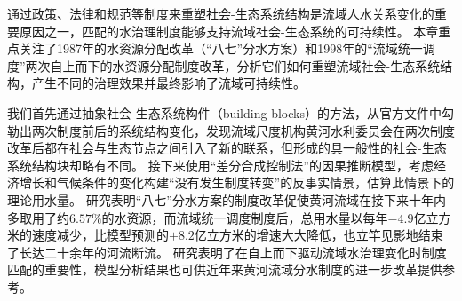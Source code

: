 通过政策、法律和规范等制度来重塑社会-生态系统结构是流域人水关系变化的重要原因之一，匹配的水治理制度能够支持流域社会-生态系统的可持续性。
本章重点关注了1987年的水资源分配改革（“八七”分水方案）和1998年的“流域统一调度”两次自上而下的水资源分配制度改革，分析它们如何重塑流域社会-生态系统结构，产生不同的治理效果并最终影响了流域可持续性。

我们首先通过抽象社会-生态系统构件（building blocks）的方法，从官方文件中勾勒出两次制度前后的系统结构变化，发现流域尺度机构黄河水利委员会在两次制度改革后都在社会与生态节点之间引入了新的联系，但形成的具一般性的社会-生态系统结构块却略有不同。
接下来使用“差分合成控制法”的因果推断模型，考虑经济增长和气候条件的变化构建“没有发生制度转变”的反事实情景，估算此情景下的理论用水量。
研究表明“八七”分水方案的制度改革促使黄河流域在接下来十年内多取用了约$6.57\%$的水资源，而流域统一调度制度后，总用水量以每年$-4.9$亿立方米的速度减少，比模型预测的$+8.2$亿立方米的增速大大降低，也立竿见影地结束了长达二十余年的河流断流。
研究表明了在自上而下驱动流域水治理变化时制度匹配的重要性，模型分析结果也可供近年来黄河流域分水制度的进一步改革提供参考。
